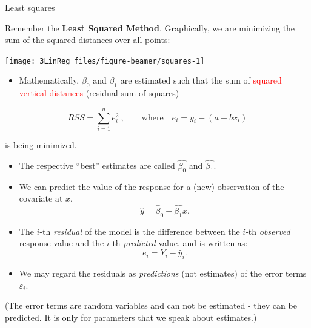 \documentclass[10pt,ignorenonframetext,]{beamer}
\providecommand{\tightlist}{%
  \setlength{\itemsep}{0pt}\setlength{\parskip}{0pt}}
\begin{document}
\begin{frame}

\begin{block}{Least squares}

Remember the \textbf{Least Squared Method}. Graphically, we are
minimizing the sum of the squared distances over all points:

\begin{center}\texttt{[image: 3LinReg\_files/figure-beamer/squares-1]} \end{center}

\end{block}

\end{frame}

\begin{frame}

\begin{itemize}
\tightlist
\item
  Mathematically, \(\beta_0\) and \(\beta_1\) are estimated such that
  the sum of \textcolor{red}{squared vertical distances} (residual sum
  of squares)
\end{itemize}

\[RSS = \sum_{i=1}^n e_i^2 \ , \qquad \text{where} \quad e_i = y_i - (a + b x_i) \]

is being minimized.

\begin{itemize}
\item
  The respective ``best'' estimates are called \(\hat{\beta_0}\) and
  \(\hat{\beta_1}\).
\item
  We can predict the value of the response for a (new) observation of
  the covariate at \(x\). \[\hat{y} = \hat{\beta}_0 + \hat{\beta_1}x.\]
\item
  The \(i\)-th \emph{residual} of the model is the difference between
  the \(i\)-th \emph{observed} response value and the \(i\)-th
  \emph{predicted} value, and is written as: \[e_i = Y_i - \hat{y}_i.\]
\item
  We may regard the residuals as \emph{predictions} (not estimates) of
  the error terms \(\varepsilon_i\).
\end{itemize}

\tiny
(The error terms are random variables and can not be estimated - they
can be predicted. It is only for parameters that we speak about
estimates.)

\end{frame}
\end{document}
